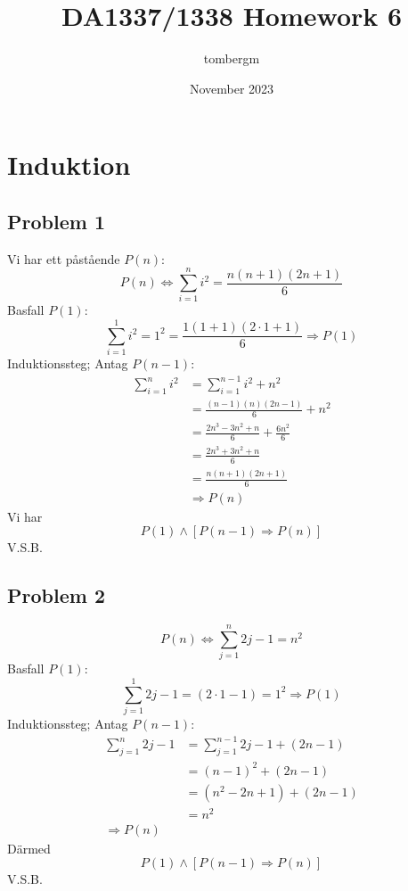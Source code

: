 \documentclass{article}
\title{DA1337/1338 Homework 6}
\author{tombergm}
\date{November 2023}
\begin{document}
\maketitle
\thispagestyle{fancy}

\renewcommand{\contentsname}{Innehållsförteckning}
\tableofcontents

\pagebreak
\section{Induktion}

\subsection{Problem 1}
Vi har ett påstående $P(n)$:
\[ P(n) \Leftrightarrow \sum_{i=1}^{n}{i^2} = \frac{n(n + 1)(2n + 1)}{6} \]
Basfall $P(1)$:
\[ \sum_{i=1}^{1}{i^2} = 1^2 = \frac{1(1 + 1)(2 \cdot 1 + 1)}{6} \Rightarrow P(1) \]
Induktionssteg; Antag $ P(n - 1) $:
\begin{align*}
\sum_{i=1}^{n}{i^2} & = \sum_{i=1}^{n - 1}{i^2} + n^2 \\
                    & = \frac{(n - 1)(n)(2n - 1)}{6} + n^2 \\
                    & = \frac{2n^3 - 3n^2 + n}{6} + \frac{6n^2}{6} \\
                    & = \frac{2n^3 + 3n^2 + n}{6} \\
                    & = \frac{n(n + 1)(2n + 1)}{6} \\
                    & \Rightarrow P(n)
\end{align*}
Vi har
\[ P(1) \land \left[P(n - 1) \Rightarrow P(n)\right] \]
V.S.B.

\subsection{Problem 2}
\[ P(n) \Leftrightarrow \sum_{j=1}^{n}{2j - 1} = n^2 \]
Basfall $ P(1) $:
\[ \sum_{j=1}^{1}{2j - 1} = (2 \cdot 1 - 1) = 1^2 \Rightarrow P(1) \]
Induktionssteg; Antag $ P(n - 1) $:
\[
\begin{aligned}
\sum_{j=1}^{n}{2j - 1} & = \sum_{j=1}^{n - 1}{2j - 1} + (2n - 1) \\
                       & = (n - 1)^2 + (2n - 1) \\
                       & = (n^2 - 2n + 1) + (2n - 1) \\
                       & = n^2 \\
\Rightarrow P(n)
\end{aligned}
\]
Därmed
\[ P(1) \land \left[P(n - 1) \Rightarrow P(n)\right] \]
V.S.B.
\end{document}

